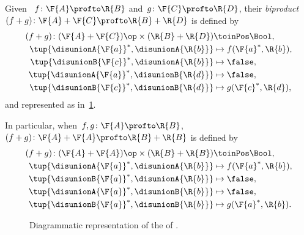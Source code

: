 \begin{definition}
    \label{def:biproduct-dp}
    Given ~$f\colon \F{A} \profto \R{B}$ and~$g\colon \F{C} \profto \R{D}$, their \emph{biproduct}~$(f + g)\colon \F{A} + \F{C} \profto \R{B} + \R{D}$ is defined by
    \begin{equation}
        \begin{aligned}
            (f + g)
            \colon (\F{A} + \F{C})\op  \times (\R{B} + \R{D}) & \toinPos \Bool, \\
            \tup{ \disunionA{\F{a}}^*, \disunionA{\R{b}}}     & \mapsto f(\F{a}^*, \R{b}), \\
            \tup{ \disunionB{\F{c}}^*, \disunionA{\R{b}}}     & \mapsto \false, \\
            \tup{ \disunionA{\F{a}}^*, \disunionB{\R{d}}}     & \mapsto \false, \\
            \tup{ \disunionB{\F{c}}^*, \disunionB{\R{d}}}     & \mapsto g(\F{c}^*, \R{d}),
        \end{aligned}
    \end{equation}
    and represented as in~\cref{fig:biproductdp}.

    In particular, when~$f, g\colon \F{A} \profto \R{B}$,~$(f + g)\colon \F{A} + \F{A} \profto \R{B} + \R{B}$ is defined by
    \begin{equation}
        \begin{aligned}
            (f + g)
            \colon (\F{A} + \F{A})\op  \times (\R{B} + \R{B}) & \toinPos \Bool, \\
            \tup{ \disunionA{\F{a}}^*, \disunionA{\R{b}}}     & \mapsto f(\F{a}^*, \R{b}), \\
            \tup{ \disunionB{ \F{a}}^*, \disunionA{\R{b}}}    & \mapsto \false, \\
            \tup{ \disunionA{\F{a}}^*, \disunionB{ \R{b}}}    & \mapsto \false, \\
            \tup{ \disunionB{ \F{a}}^*, \disunionB{ \R{b}}}   & \mapsto g(\F{a}^*, \R{b}).
        \end{aligned}
    \end{equation}
\end{definition}

\begin{figure}[h!]
    \begin{center}
    \end{center}
    \caption{Diagrammatic representation of the  of . }
    \label{fig:biproductdp}
\end{figure}

